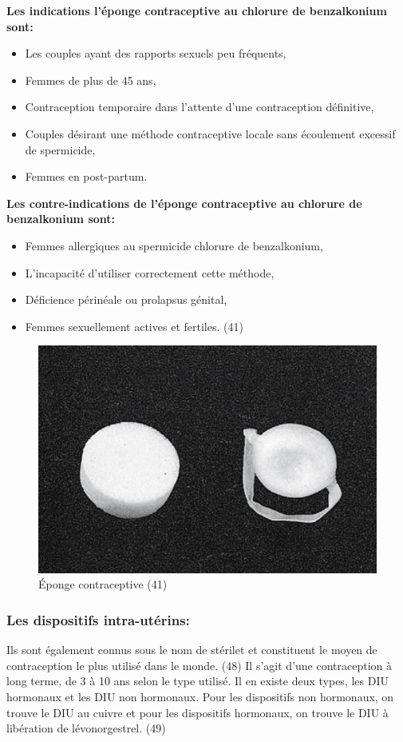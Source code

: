 \noindent \textbf{Les indications l’éponge contraceptive au chlorure de benzalkonium sont:}

\begin{itemize}[label={$\bullet$}, align=right]
  \item Les couples ayant des rapports sexuels peu fréquents,
  \item	Femmes de plus de 45 ans,  
  \item Contraception temporaire dans l’attente d’une contraception définitive, 
  \item Couples désirant une méthode contraceptive locale sans écoulement excessif de spermicide, 
  \item	Femmes en post-partum. 
\end{itemize}

\noindent \textbf{Les contre-indications de l’éponge contraceptive au chlorure de benzalkonium sont:}
\begin{itemize}[label={$\bullet$}, align=right]
  \item Femmes allergiques au spermicide chlorure de benzalkonium, 
  \item L’incapacité d’utiliser correctement cette méthode, 
  \item Déficience périnéale ou prolapsus génital, 
  \item Femmes sexuellement actives et fertiles. (41) 
\end{itemize}

\begin{figure}[H]
  \centering
  \includegraphics{Images/fig_23.jpg}
  \caption{Éponge contraceptive (41)}
\end{figure}

\subsubsection{Les dispositifs intra-utérins:}
\noindent Ils sont également connus sous le nom de stérilet et constituent le moyen de contraception le plus utilisé dans le monde. (48) Il s’agit d’une contraception à long terme, de 3 à 10 ans selon le type utilisé. Il en existe deux types, les DIU hormonaux et les DIU non hormonaux. Pour les dispositifs non hormonaux, on trouve le DIU au cuivre et pour les dispositifs hormonaux, on trouve le DIU à libération de lévonorgestrel. (49) \\

